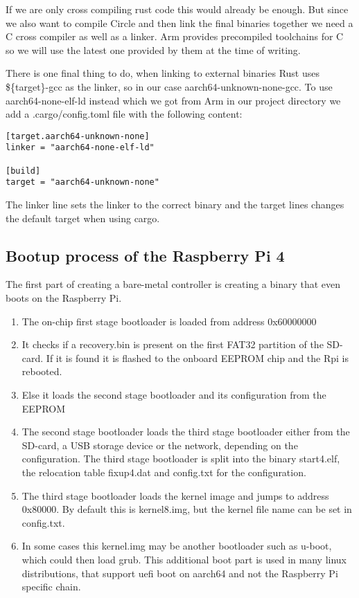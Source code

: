 If we are only cross compiling rust code this would already be enough.
But since we also want to compile Circle and then link the final binaries together we need a C cross compiler as well as a linker.
Arm provides precompiled toolchains for C so we will use the latest one provided by them at the time of writing.

There is one final thing to do, when linking to external binaries Rust uses \$\{target\}-gcc as the linker, so in our case aarch64-unknown-none-gcc.
To use aarch64-none-elf-ld instead which we got from Arm in our project directory we add a .cargo/config.toml file with the following content:
\begin{verbatim}
[target.aarch64-unknown-none]
linker = "aarch64-none-elf-ld"

[build]
target = "aarch64-unknown-none"
\end{verbatim}
The linker line sets the linker to the correct binary and the target lines changes the default target when using cargo.

\subsection{Bootup process of the Raspberry Pi 4}
\label{sec:concept_and_implementation:bare-metal:boot}

The first part of creating a bare-metal controller is creating a binary that even boots on the Raspberry Pi.
\begin{enumerate}
    \item The on-chip first stage bootloader is loaded from address 0x60000000
    \item It checks if a recovery.bin is present on the first FAT32 partition of the SD-card. If it is found it is flashed to the onboard EEPROM chip and the Rpi is rebooted.
    \item Else it loads the second stage bootloader and its configuration from the EEPROM
    \item The second stage bootloader loads the third stage bootloader either from the SD-card, a USB storage device or the network, depending on the configuration.
          The third stage bootloader is split into the binary start4.elf, the relocation table fixup4.dat and config.txt for the configuration.
    \item The third stage bootloader loads the kernel image and jumps to address 0x80000. By default this is kernel8.img, but the kernel file name can be set in config.txt.
    \item In some cases this kernel.img may be another bootloader such as u-boot, which could then load grub.
          This additional boot part is used in many linux distributions, that support uefi boot on aarch64 and not the Raspberry Pi specific chain.
\end{enumerate}

